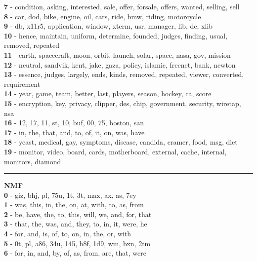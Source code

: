 \textbf{7} - condition, asking, interested, sale, offer, forsale, offers, wanted, selling, sell\\
\textbf{8} - car, dod, bike, engine, oil, cars, ride, bmw, riding, motorcycle\\
\textbf{9} - db, x11r5, application, window, xterm, usr, manager, lib, de, xlib\\
\textbf{10} - hence, maintain, uniform, determine, founded, judges, finding, usual, removed, repeated\\
\textbf{11} - earth, spacecraft, moon, orbit, launch, solar, space, nasa, gov, mission\\
\textbf{12} - neutral, sandvik, kent, jake, gaza, policy, islamic, freenet, bank, newton\\
\textbf{13} - essence, judges, largely, ends, kinds, removed, repeated, viewer, converted, requirement\\
\textbf{14} - year, game, team, better, last, players, season, hockey, ca, score\\
\textbf{15} - encryption, key, privacy, clipper, des, chip, government, security, wiretap, nsa\\
\textbf{16} - 12, 17, 11, st, 10, buf, 00, 75, boston, san\\
\textbf{17} - in, the, that, and, to, of, it, on, was, have\\
\textbf{18} - yeast, medical, gay, symptoms, disease, candida, cramer, food, msg, diet\\
\textbf{19} - monitor, video, board, cards, motherboard, external, cache, internal, monitors, diamond\\
\hrule\vspace{2mm}
\noindent
\textbf{NMF}\vspace{2mm}\\
\vspace{2mm}
\noindent
\textbf{0} - giz, bhj, pl, 75u, 1t, 3t, max, ax, as, 7ey\\
\textbf{1} - was, this, in, the, on, at, with, to, as, from\\
\textbf{2} - be, have, the, to, this, will, we, and, for, that\\
\textbf{3} - that, the, was, and, they, to, in, it, were, he\\
\textbf{4} - for, and, is, of, to, on, in, the, or, with\\
\textbf{5} - 0t, pl, a86, 34u, 145, b8f, 1d9, wm, bxn, 2tm\\
\textbf{6} - for, in, and, by, of, as, from, are, that, were\\
